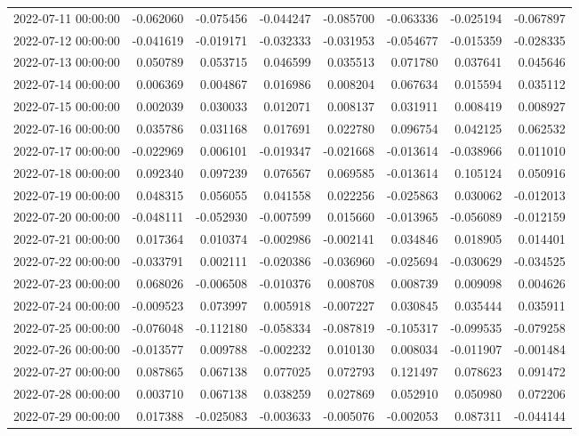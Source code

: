 \begin{tabular}{lrrrrrrr}
2022-07-11 00:00:00 & -0.062060 & -0.075456 & -0.044247 & -0.085700 & -0.063336 & -0.025194 & -0.067897 \\
2022-07-12 00:00:00 & -0.041619 & -0.019171 & -0.032333 & -0.031953 & -0.054677 & -0.015359 & -0.028335 \\
2022-07-13 00:00:00 & 0.050789 & 0.053715 & 0.046599 & 0.035513 & 0.071780 & 0.037641 & 0.045646 \\
2022-07-14 00:00:00 & 0.006369 & 0.004867 & 0.016986 & 0.008204 & 0.067634 & 0.015594 & 0.035112 \\
2022-07-15 00:00:00 & 0.002039 & 0.030033 & 0.012071 & 0.008137 & 0.031911 & 0.008419 & 0.008927 \\
2022-07-16 00:00:00 & 0.035786 & 0.031168 & 0.017691 & 0.022780 & 0.096754 & 0.042125 & 0.062532 \\
2022-07-17 00:00:00 & -0.022969 & 0.006101 & -0.019347 & -0.021668 & -0.013614 & -0.038966 & 0.011010 \\
2022-07-18 00:00:00 & 0.092340 & 0.097239 & 0.076567 & 0.069585 & -0.013614 & 0.105124 & 0.050916 \\
2022-07-19 00:00:00 & 0.048315 & 0.056055 & 0.041558 & 0.022256 & -0.025863 & 0.030062 & -0.012013 \\
2022-07-20 00:00:00 & -0.048111 & -0.052930 & -0.007599 & 0.015660 & -0.013965 & -0.056089 & -0.012159 \\
2022-07-21 00:00:00 & 0.017364 & 0.010374 & -0.002986 & -0.002141 & 0.034846 & 0.018905 & 0.014401 \\
2022-07-22 00:00:00 & -0.033791 & 0.002111 & -0.020386 & -0.036960 & -0.025694 & -0.030629 & -0.034525 \\
2022-07-23 00:00:00 & 0.068026 & -0.006508 & -0.010376 & 0.008708 & 0.008739 & 0.009098 & 0.004626 \\
2022-07-24 00:00:00 & -0.009523 & 0.073997 & 0.005918 & -0.007227 & 0.030845 & 0.035444 & 0.035911 \\
2022-07-25 00:00:00 & -0.076048 & -0.112180 & -0.058334 & -0.087819 & -0.105317 & -0.099535 & -0.079258 \\
2022-07-26 00:00:00 & -0.013577 & 0.009788 & -0.002232 & 0.010130 & 0.008034 & -0.011907 & -0.001484 \\
2022-07-27 00:00:00 & 0.087865 & 0.067138 & 0.077025 & 0.072793 & 0.121497 & 0.078623 & 0.091472 \\
2022-07-28 00:00:00 & 0.003710 & 0.067138 & 0.038259 & 0.027869 & 0.052910 & 0.050980 & 0.072206 \\
2022-07-29 00:00:00 & 0.017388 & -0.025083 & -0.003633 & -0.005076 & -0.002053 & 0.087311 & -0.044144 \\

\end{tabular}
